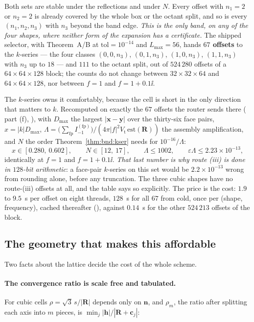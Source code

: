 \noindent
Both sets are stable under the reflections and under $N$. Every offset with $n_1 = 2$ or
$n_2 = 2$ is already covered by the whole box or the octant split, and so is every
$(n_1,n_2,n_3)$ with $n_3$ beyond the band edge. \emph{This is the only band, on any of the
four shapes, where neither form of the expansion has a certificate.} The shipped selector,
with Theorem~A/B at $\mathrm{tol} = 10^{-14}$ and $L_{\max} = 56$, hands
\textbf{$67$ offsets} to the $k$-series --- the four classes $(0,0,n_3)$, $(0,1,n_3)$,
$(1,0,n_3)$, $(1,1,n_3)$ with $n_3$ up to $18$ --- and $111$ to the octant split, out of
$524\,280$ offsets of a $64\times64\times128$ block; the counts do not change between
$32\times32\times64$ and $64\times64\times128$, nor between $f = 1$ and $f = 1+0.1\ii$.

The $k$-series owns it comfortably, because the cell is short in the only direction that
matters to $k$. Recomputed on exactly the $67$ offsets the router sends there
( part (f), ), with $D_{\max}$ the largest
$|\mathbf{x}-\mathbf{y}|$ over the thirty-six face pairs, $x = |k|D_{\max}$,
$\Lambda = \bigl(\sum_{\mathrm{fp}}I^{(\mathrm{fp})}_{-1}\bigr)/
(4\pi|f|^2V_{\mathrm{t}}\,\mathrm{est}(\mathbf{R}))$ the assembly amplification, and $N$
the order Theorem~\ref{thm:bnd:kser} needs for $10^{-16}/\Lambda$:
\[
x \in [0.280,\ 0.602], \qquad N \in [12,\ 17], \qquad
\Lambda \le 1002, \qquad \varepsilon\Lambda \le 2.23\times10^{-13},
\]
identically at $f = 1$ and $f = 1+0.1\ii$. \emph{That last number is why route (iii) is
done in $128$-bit arithmetic}: a  face-pair $k$-series on this set would be
$2.2\times10^{-13}$ wrong from rounding alone, before any truncation. The three cubic
shapes have no route-(iii) offsets at all, and the table says so explicitly. The price is
the cost: $1.9$ to $9.5$~s per offset on eight threads, $128$~s for all $67$ from cold, once
per (shape, frequency), cached thereafter (), against $0.14$~s for the
other $524\,213$ offsets of the block.

\subsection{The geometry that makes this affordable}
\label{sec:join:geom}

Two facts about the lattice decide the cost of the whole scheme.

\paragraph{The convergence ratio is scale free and tabulated.} For cubic cells
$\rho = \sqrt{3}\,s/|\mathbf{R}|$ depends only on $\mathbf{n}$, and
$\rho_m$, the ratio after splitting each axis into $m$ pieces, is
$\min_j |\mathbf{h}|/|\mathbf{R}+\mathbf{c}_j|$:

